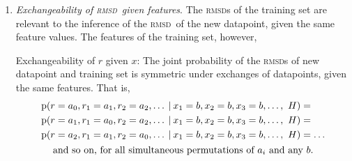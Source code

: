 \documentclass[\ifafour a4paper,12pt,\else a5paper,10pt,\fi%
onecolumn,oneside,article,%
british%
]{memoir}
\theoremstyle{remark}
\theoremstyle{innote}
\newcommand*{\p}{\mathrm{p}}%
\renewcommand*{\|}[1][]{\nonscript\:#1\vert\nonscript\:\mathopen{}}
\renewcommand*{\=}{\TextOrMath\texteq\eq}
\newcommand*{\rmsd}{\textsc{rmsd}}
\begin{document}
\begin{enumerate}[label=\roman*.]
\item\label{item:exch_rx}\emph{Exchangeability of \rmsd\ given features}.
  The \rmsd s of the training set are relevant to the inference of the
  \rmsd\ of the new datapoint, given the same feature values. The features
  of the training set, however,

  Exchangeability of $r$ given $x$: The joint
  probability of the \rmsd s of new datapoint and training set is symmetric
  under exchanges of datapoints, given the same features. That is,
  \begin{multline}
    \label{eq:p_exch_rx}
    \begin{aligned}
    &\p(r=a_{0}, r_{1}=a_{1}, r_{2}=a_{2}, \dotsc \|
    x_{1}=b, x_{2}=b, x_{3}=b, \dotsc,\ H) ={}\\
    &\p(r=a_{1}, r_{1}=a_{0}, r_{2}=a_{2}, \dotsc \|
    x_{1}=b, x_{2}=b, x_{3}=b, \dotsc,\ H) ={}\\
    &\p(r=a_{2}, r_{1}=a_{1}, r_{2}=a_{0}, \dotsc \|
    x_{1}=b, x_{2}=b, x_{3}=b, \dotsc,\ H) = \dotso
    \end{aligned} \\
    \text{and so on, for all simultaneous permutations of $a_{i}$ and any $b$.}
  \end{multline}


\end{enumerate}
\end{document}
